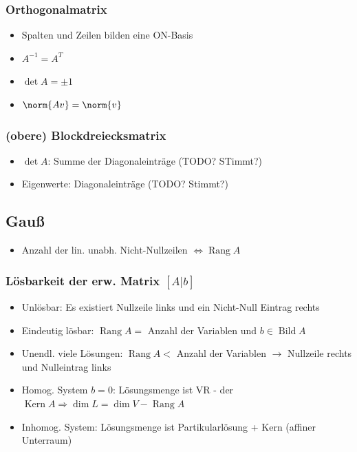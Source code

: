 \documentclass[german, fourcolumn, 8pt]{latex4ei/latex4ei_sheet}
\newcommand{\equival}[0]{\ensuremath{\Longleftrightarrow}}
\DeclareMathOperator{\Rang}{Rang}
\DeclareMathOperator{\Kern}{Kern}
\DeclareMathOperator{\Bild}{Bild}
\begin{document}
\begin{sectionbox}
    \subsubsection{Orthogonalmatrix}
    \begin{itemize}
        \item Spalten und Zeilen bilden eine ON-Basis
        \item $A^{-1}=A^T$
        \item $\det A = \pm 1$
        \item $\norm{Av}=\norm{v}$
    \end{itemize}

    \subsubsection{(obere) Blockdreiecksmatrix}
    \begin{itemize}
        \item $\det A$: Summe der Diagonaleinträge (TODO? STimmt?)
        \item Eigenwerte: Diagonaleinträge (TODO? Stimmt?)
    \end{itemize}
\end{sectionbox}

\begin{sectionbox}
    \subsection{Gauß}
    \begin{itemize}
        \item Anzahl der lin. unabh. Nicht-Nullzeilen $\equival \Rang A$
    \end{itemize}

    \subsubsection{Lösbarkeit der erw. Matrix $[A|b]$}
    \begin{itemize}
        \item Unlösbar: Es existiert Nullzeile links und ein Nicht-Null Eintrag rechts
        \item Eindeutig lösbar: $\Rang A =$ Anzahl der Variablen und $b \in \Bild A$
        \item Unendl. viele Lösungen: $\Rang A <$ Anzahl der Variablen $\rightarrow$ Nullzeile rechts und Nulleintrag links
        \item Homog. System $b=0$: Lösungsmenge ist VR - der $\Kern A \Rightarrow \dim L=\dim V - \Rang A$
        \item Inhomog. System: Lösungsmenge ist Partikularlösung + Kern (affiner Unterraum)
    \end{itemize}
\end{sectionbox}

\label{LastPage}
\end{document}

